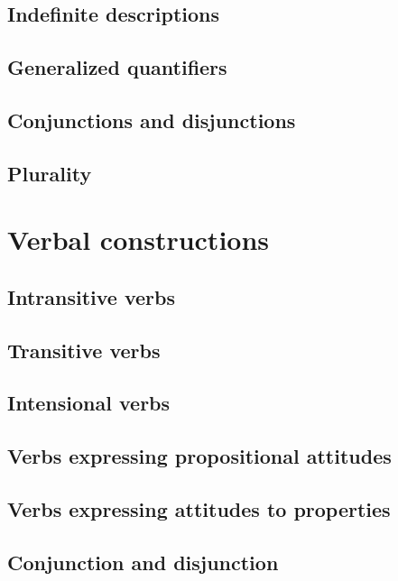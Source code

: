 \subsection{Indefinite descriptions}

\subsection{Generalized quantifiers}

\subsection{Conjunctions and disjunctions}

\subsection{Plurality}

\newpage

\section{Verbal constructions}

\subsection{Intransitive verbs}

\subsection{Transitive verbs}

\subsection{Intensional verbs}

\subsection{Verbs expressing propositional attitudes}

\subsection{Verbs expressing attitudes to properties}

\subsection{Conjunction and disjunction}

